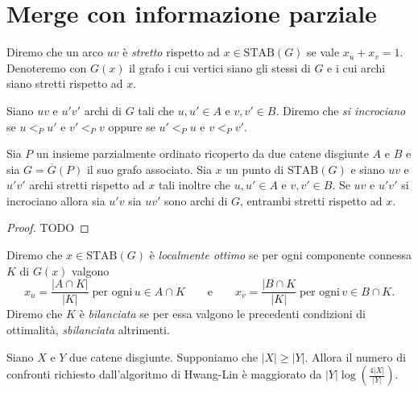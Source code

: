 \section{Merge con informazione parziale} 
\begin{definition}
	Diremo che un arco \(uv\) è \emph{stretto} rispetto ad \(x\in\text{STAB}(G)\) se vale \(x_u+x_v=1\). Denoteremo con \(G(x)\) il grafo i cui vertici siano gli stessi di \(G\) e i cui archi siano stretti rispetto ad \(x\). 
\end{definition}
\begin{definition}
	Siano \(uv\) e \(u'v'\) archi di \(G\) tali che \(u,u'\in A\) e \(v,v'\in B\). Diremo che \emph{si incrociano} se \(u<_{P}u'\) e \(v'<_{P}v\) oppure se \(u'<_{P}u\) e \(v<_{P}v'\). 
\end{definition}
\begin{lemma}
	Sia \(P\) un insieme parzialmente ordinato ricoperto da due catene disgiunte \(A\) e \(B\) e sia \(G=\overline{G}(P)\) il suo grafo associato. Sia \(x\) un punto di \(\text{STAB}(G)\) e siano \(uv\) e \(u'v'\) archi stretti rispetto ad \(x\) tali inoltre che \(u,u'\in A\) e \(v,v'\in B\). Se \(uv\) e \(u'v'\) si incrociano allora sia \(u'v\) sia \(uv'\) sono archi di \(G\), entrambi stretti rispetto ad \(x\). 
\end{lemma}
\begin{proof}
	TODO 
\end{proof}
\begin{definition}
	Diremo che \(x\in\text{STAB}(G)\) è \emph{localmente ottimo} se per ogni componente connessa \(K\) di \(G(x)\) valgono
	\[x_u=\frac{|A\cap K|}{|K|}\;\text{per ogni}\,u\in A\cap K\qquad\text{e}\qquad x_v=\frac{|B\cap K}{|K|}\;\text{per ogni}\,v\in B\cap K.\]
	Diremo che \(K\) è \emph{bilanciata} se per essa valgono le precedenti condizioni di ottimalità, \emph{sbilanciata} altrimenti. 
\end{definition}
\begin{lemma}
	Siano \(X\) e \(Y\) due catene disgiunte. Supponiamo che \(|X|\ge|Y|\). Allora il numero di confronti richiesto dall'algoritmo di Hwang-Lin è maggiorato da \(|Y|\log(\frac{4|X|}{|Y|})\). 
\end{lemma}
